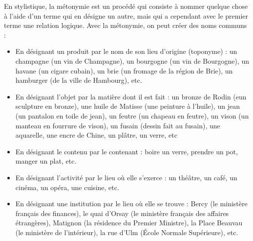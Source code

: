 En stylistique, la métonymie est un procédé qui consiste à nommer quelque chose à l’aide d’un terme qui en désigne un autre, mais qui a cependant avec le premier terme une relation logique. Avec la métonymie, on peut créer des noms communs :
\begin{itemize}
\item En désignant un produit par le nom de son lieu d’origine (toponyme) : un champagne (un vin de Champagne), un bourgogne (un vin de Bourgogne), un havane (un cigare cubain), un brie (un fromage de la région de Brie), un hamburger (de la ville de Hambourg), etc.
\item En désignant l’objet par la matière dont il est fait : un bronze de Rodin (eun sculpture en bronze), une huile de Matisse (une peinture à l’huile), un jean (un pantalon en toile de jean), un feutre (un chapeau en feutre), un vison (un manteau en fourrure de vison), un fusain (dessin fait au fusain), une aquarelle, une encre de Chine, un plâtre, un verre, etc
\item En désignant le contenu par le contenant : boire un verre, prendre un pot, manger un plat, etc.
\item En désignant l’activité par le lieu où elle s’exerce : un théâtre, un café, un cinéma, un opéra, une cuisine, etc.
\item En désignant une institution par le lieu où elle se trouve : Bercy (le ministère français des finances), le quai d’Orsay (le ministère français des affaires étrangères), Matignon (la résidence du Premier Ministre), la Place Beauvau (le ministère de l’intérieur), la rue d’Ulm (École Normale Supérieure), etc.
\end{itemize}


